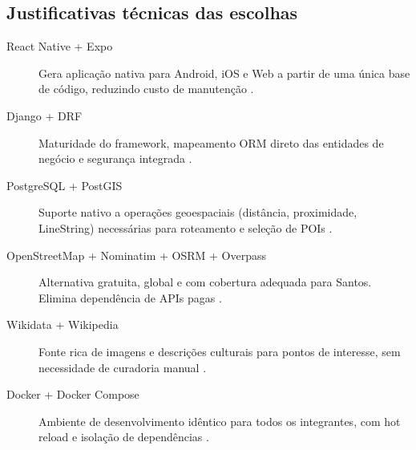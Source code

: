 \documentclass[12pt, a4paper]{article}
\begin{document}
\subsection{Justificativas t\'ecnicas das escolhas}

\begin{description}
  \item[React Native + Expo] Gera aplica\c{c}\~ao nativa para Android, iOS e Web a partir de uma \'unica base de c\'odigo, reduzindo custo de manuten\c{c}\~ao \cite{reactnative2024, expo2024}.
  \item[Django + DRF] Maturidade do framework, mapeamento ORM direto das entidades de neg\'ocio e seguran\c{c}a integrada \cite{django2024, drf2024, holovaty2009}.
  \item[PostgreSQL + PostGIS] Suporte nativo a opera\c{c}\~oes geoespaciais (dist\^ancia, proximidade, LineString) necess\'arias para roteamento e sele\c{c}\~ao de POIs \cite{postgis2024}.
  \item[OpenStreetMap + Nominatim + OSRM + Overpass] Alternativa gratuita, global e com cobertura adequada para Santos. Elimina depend\^encia de APIs pagas \cite{osm2024, nominatim2024, osrm2024, overpass2024}.
  \item[Wikidata + Wikipedia] Fonte rica de imagens e descri\c{c}\~oes culturais para pontos de interesse, sem necessidade de curadoria manual \cite{wikidata2024, wikipedia2024}.
  \item[Docker + Docker Compose] Ambiente de desenvolvimento id\^entico para todos os integrantes, com hot reload e isola\c{c}\~ao de depend\^encias \cite{docker2024, humble2010}.
\end{description}

\printbibliography[title={Refer\^encias}]
\end{document}
